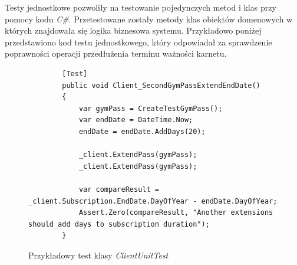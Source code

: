 \documentclass[a4paper,twoside,12pt]{book}
\begin{document}
Testy jednostkowe pozwoliły na testowanie pojedynczych metod i klas przy pomocy kodu \textit{C\#}. Przetestowane zostały metody klas obiektów domenowych w których znajdowała się logika biznesowa systemu. Przykładowo poniżej przedstawiono kod testu jednostkowego, który odpowiadał za sprawdzenie poprawności operacji przedłużenia terminu ważności karnetu.
\begin{figure} [H]
	\centering
	\begin{lstlisting}
		[Test]
		public void Client_SecondGymPassExtendEndDate()
		{
			var gymPass = CreateTestGymPass();
			var endDate = DateTime.Now;
			endDate = endDate.AddDays(20);
			
			_client.ExtendPass(gymPass);
			_client.ExtendPass(gymPass);
			
			var compareResult = _client.Subscription.EndDate.DayOfYear - endDate.DayOfYear;
			Assert.Zero(compareResult, "Another extensions should add days to subscription duration");
		}
	\end{lstlisting}
	\caption{Przykładowy test klasy \textit{ClientUnitTest}}
	\label{fig:secondGymPassExtendEndDate}
\end{figure}
\end{document}
